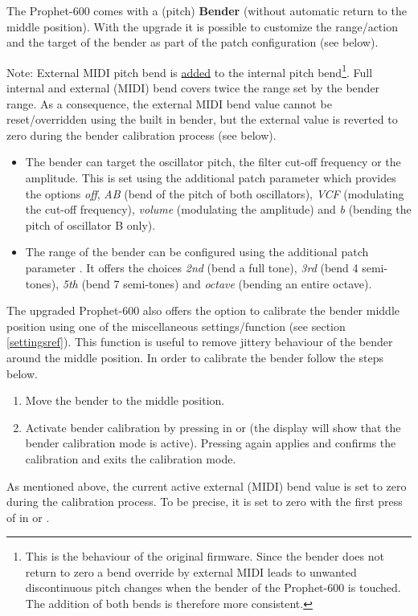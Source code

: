 The Prophet-600 comes with a (pitch) \textbf{Bender} (without automatic return to the middle position). With the upgrade it is possible to customize the range/action and the target of the bender as part of the patch configuration (see below). 

Note: External MIDI pitch bend is \underline{added} to the internal pitch bend\footnote{This is the behaviour of the original firmware. Since the bender does not return to zero a bend override by external MIDI leads to unwanted discontinuous pitch changes when the bender of the Prophet-600 is touched. The addition of both bends is therefore more consistent.}. Full internal and external (MIDI) bend covers twice the range set by the bender range. As a consequence, the external MIDI bend value cannot be reset/overridden using the built in bender, but the external value is reverted to zero during the bender calibration process (see below).

\begin{itemize}
  \item The bender can target the oscillator pitch, the filter cut-off frequency or the amplitude. This is set using the additional patch parameter \bentarget which provides the options \textit{off}, \textit{AB} (bend of the pitch of both oscillators), \textit{VCF} (modulating the cut-off frequency), \textit{volume} (modulating the amplitude) and \textit{b} (bending the pitch of oscillator B only).
  \item The range of the bender can be configured using the additional patch parameter \bendrange. It offers the choices \textit{2nd} (bend a full tone), \textit{3rd} (bend 4 semi-tones), \textit{5th} (bend 7 semi-tones) and \textit{octave} (bending an entire octave).
\end{itemize}

The upgraded Prophet-600 also offers the option to calibrate the bender middle position using one of the miscellaneous settings/function (see section \ref{settingsref}). This function is useful to remove jittery behaviour of the bender around the middle position. In order to calibrate the bender follow the steps below.

\begin{enumerate}
  \item Move the bender to the middle position.  
  \item Activate bender calibration by pressing  in \shiftmode or \shiftlock (the display will show that the bender calibration mode is active). Pressing  again applies and confirms the calibration and exits the calibration mode.
\end{enumerate}

As mentioned above, the current active external (MIDI) bend value is set to zero during the calibration process. To be precise, it is set to zero with the first press of  in \shiftmode or \shiftlock.
